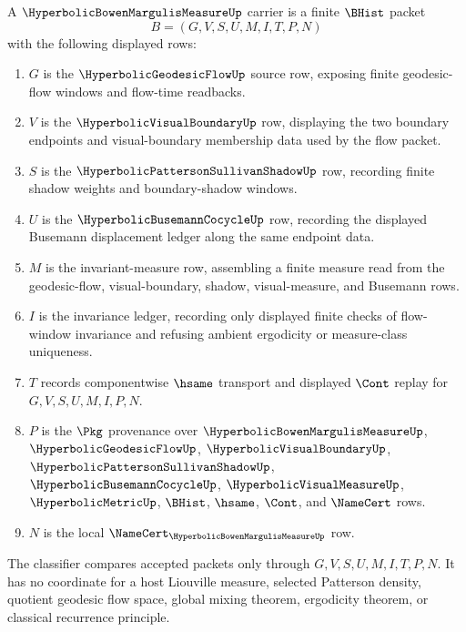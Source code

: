 \begin{definition}
\label{def:hyperbolic-bowen-margulis-measure-carrier}
A $\HyperbolicBowenMargulisMeasureUp$ carrier is a finite $\BHist$ packet
$$
B=(G,V,S,U,M,I,T,P,N)
$$
with the following displayed rows:
\begin{enumerate}
\item $G$ is the $\HyperbolicGeodesicFlowUp$ source row, exposing finite geodesic-flow windows and flow-time readbacks.
\item $V$ is the $\HyperbolicVisualBoundaryUp$ row, displaying the two boundary endpoints and visual-boundary membership data used by the flow packet.
\item $S$ is the $\HyperbolicPattersonSullivanShadowUp$ row, recording finite shadow weights and boundary-shadow windows.
\item $U$ is the $\HyperbolicBusemannCocycleUp$ row, recording the displayed Busemann displacement ledger along the same endpoint data.
\item $M$ is the invariant-measure row, assembling a finite measure read from the geodesic-flow, visual-boundary, shadow, visual-measure, and Busemann rows.
\item $I$ is the invariance ledger, recording only displayed finite checks of flow-window invariance and refusing ambient ergodicity or measure-class uniqueness.
\item $T$ records componentwise $\hsame$ transport and displayed $\Cont$ replay for $G,V,S,U,M,I,P,N$.
\item $P$ is the $\Pkg$ provenance over $\HyperbolicBowenMargulisMeasureUp$, $\HyperbolicGeodesicFlowUp$, $\HyperbolicVisualBoundaryUp$, $\HyperbolicPattersonSullivanShadowUp$, $\HyperbolicBusemannCocycleUp$, $\HyperbolicVisualMeasureUp$, $\HyperbolicMetricUp$, $\BHist$, $\hsame$, $\Cont$, and $\NameCert$ rows.
\item $N$ is the local $\NameCert_{\HyperbolicBowenMargulisMeasureUp}$ row.
\end{enumerate}
The classifier compares accepted packets only through $G,V,S,U,M,I,T,P,N$. It has no coordinate for a host Liouville measure, selected Patterson density, quotient geodesic flow space, global mixing theorem, ergodicity theorem, or classical recurrence principle.
\end{definition}

